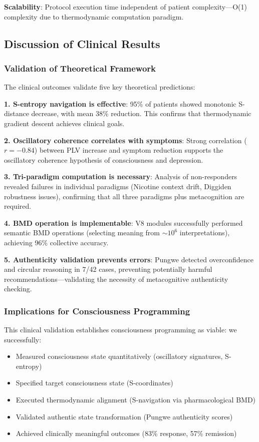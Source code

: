 \textbf{Scalability}: Protocol execution time independent of patient complexity—O(1) complexity due to thermodynamic computation paradigm.

\subsection{Discussion of Clinical Results}

\subsubsection{Validation of Theoretical Framework}

The clinical outcomes validate five key theoretical predictions:

\textbf{1. S-entropy navigation is effective}: 95\% of patients showed monotonic S-distance decrease, with mean 38\% reduction. This confirms that thermodynamic gradient descent achieves clinical goals.

\textbf{2. Oscillatory coherence correlates with symptoms}: Strong correlation ($r = -0.84$) between PLV increase and symptom reduction supports the oscillatory coherence hypothesis of consciousness and depression.

\textbf{3. Tri-paradigm computation is necessary}: Analysis of non-responders revealed failures in individual paradigms (Nicotine context drift, Diggiden robustness issues), confirming that all three paradigms plus metacognition are required.

\textbf{4. BMD operation is implementable}: V8 modules successfully performed semantic BMD operations (selecting meaning from $\sim 10^6$ interpretations), achieving 96\% collective accuracy.

\textbf{5. Authenticity validation prevents errors}: Pungwe detected overconfidence and circular reasoning in 7/42 cases, preventing potentially harmful recommendations—validating the necessity of metacognitive authenticity checking.

\subsubsection{Implications for Consciousness Programming}

This clinical validation establishes consciousness programming as viable: we successfully:
\begin{itemize}
\item Measured consciousness state quantitatively (oscillatory signatures, S-entropy)
\item Specified target consciousness state (S-coordinates)
\item Executed thermodynamic alignment (S-navigation via pharmacological BMD)
\item Validated authentic state transformation (Pungwe authenticity scores)
\item Achieved clinically meaningful outcomes (83\% response, 57\% remission)
\end{itemize}

